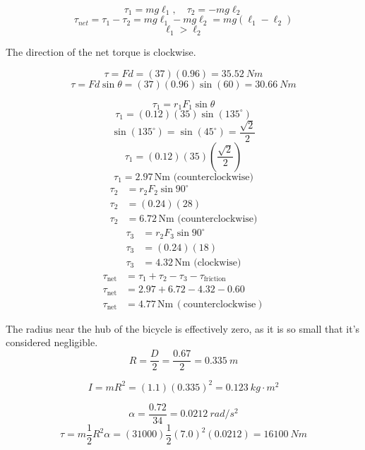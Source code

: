 \documentclass[11pt]{homework}
\begin{document}
\setcounter{questionCounter}{27}
\question
\[
\tau_1 = mg\ell_1, \quad \tau_2 =-mg\ell_2
\]
\[
    \tau_{net}=\tau_1 - \tau_2 =mg\ell_1 -mg\ell_2 = mg(\ell_1-\ell_2)
\]
\[
\ell_1 > \ell_2
\]

The direction of the net torque is clockwise.



\question
\begin{alphaparts}
\questionpart
\[
\tau=Fd = (37)(0.96)=\boxed{\qty{35.52}{Nm}}
\]
\questionpart
\[
\tau=Fd \sin\theta = (37)(0.96)\sin(60)=\boxed{\qty{30.66}{Nm}}
\]


\end{alphaparts}

\question
\[
\tau_1 = r_1 F_1 \sin \theta
\]\[
\tau_1 = (0.12)(35)\sin(135^\circ)
\]\[
\sin(135^\circ) = \sin(45^\circ) = \frac{\sqrt{2}}{2}
\]\[
\tau_1 = (0.12)(35)(\frac{\sqrt{2}}{2})
\]\[
\tau_1 = 2.97 \, \text{Nm} \text{ (counterclockwise)}
\]
\begin{align*}
\tau_2 &= r_2 F_2 \sin 90^\circ \\
\tau_2 &= (0.24)(28) \\
\tau_2 &= 6.72 \, \text{Nm} \text{ (counterclockwise)}
\end{align*}
\begin{align*}
\tau_3 &= r_2 F_3 \sin 90^\circ \\
\tau_3 &= (0.24)(18) \\
\tau_3 &= 4.32 \, \text{Nm} \text{ (clockwise)}
\end{align*}
\begin{align*}
\tau_{\text{net}} &= \tau_1 + \tau_2 - \tau_3 - \tau_{\text{friction}} \\
\tau_{\text{net}} &= 2.97 + 6.72 - 4.32 - 0.60 \\
\tau_{\text{net}} &= \boxed{4.77 \, \text{Nm}  \, (\text{counterclockwise})}
\end{align*}


\setcounter{questionCounter}{33}
\question
The radius near the hub of the bicycle is effectively zero, as it is so small that it's considered negligible.
\[
R=\frac{D}{2} = \frac{0.67}{2} = \qty{0.335}{m}
\]

\[
I = mR^2 = (1.1)(0.335)^2 = \boxed{\qty{0.123}{kg \cdot m^2}}
\]


\question
\[
\alpha=\frac{0.72}{34}=\qty{0.0212}{rad /s^2}
\]
\[
\tau = m\frac{1}{2}R^2\alpha = (31000)\frac{1}{2}(7.0)^2(0.0212)=\boxed{\qty{16100}{Nm}}
\]
\end{document}
